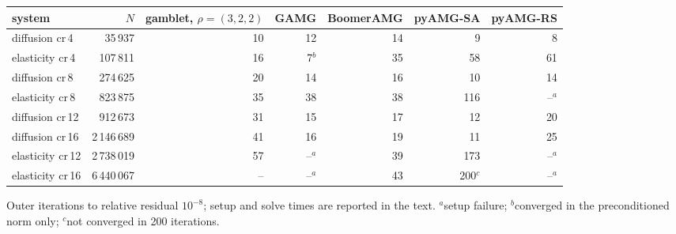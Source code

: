 {\small
\begin{tabular}{lrrrrrr}
\toprule
system & $N$ & gamblet, $\rho=(3,2,2)$ & GAMG & BoomerAMG & pyAMG-SA & pyAMG-RS \\
\midrule
diffusion cr\,4 & 35\,937 & 10 & 12 & 14 & 9 & 8 \\
elasticity cr\,4 & 107\,811 & 16 & 7$^{b}$ & 35 & 58 & 61 \\
diffusion cr\,8 & 274\,625 & 20 & 14 & 16 & 10 & 14 \\
elasticity cr\,8 & 823\,875 & 35 & 38 & 38 & 116 & --$^{a}$ \\
diffusion cr\,12 & 912\,673 & 31 & 15 & 17 & 12 & 20 \\
diffusion cr\,16 & 2\,146\,689 & 41 & 16 & 19 & 11 & 25 \\
elasticity cr\,12 & 2\,738\,019 & 57 & --$^{a}$ & 39 & 173 & --$^{a}$ \\
elasticity cr\,16 & 6\,440\,067 & -- & --$^{a}$ & 43 & 200$^{c}$ & --$^{a}$ \\
\bottomrule
\end{tabular}
\par\smallskip
{\footnotesize Outer iterations to relative residual $10^{-8}$; setup and solve times are reported in the text.  $^{a}$setup failure; $^{b}$converged in the preconditioned norm only; $^{c}$not converged in 200 iterations.}
}
